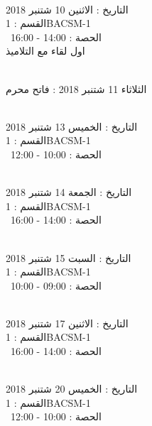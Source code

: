 \par
\noindent\makebox[\linewidth]{\rule{\paperwidth}{0.4pt}}
 \\
التاريخ : الاثنين 10 شتنبر 2018 \\
القسم : 1BACSM-1 \\
 \  
الحصة : 14:00 - 16:00 \\
\indent \indent
اول لقاء مع التلاميذ
\par
\noindent\makebox[\linewidth]{\rule{\paperwidth}{0.4pt}}
 \\
الثلاثاء 11 شتنبر 2018 :   فاتح محرم
\par
\noindent\makebox[\linewidth]{\rule{\paperwidth}{0.4pt}}
 \\
التاريخ : الخميس 13 شتنبر 2018 \\
القسم : 1BACSM-1 \\
 \  
الحصة : 10:00 - 12:00 \\
\par
\noindent\makebox[\linewidth]{\rule{\paperwidth}{0.4pt}}
 \\
التاريخ : الجمعة 14 شتنبر 2018 \\
القسم : 1BACSM-1 \\
 \  
الحصة : 14:00 - 16:00 \\
\par
\noindent\makebox[\linewidth]{\rule{\paperwidth}{0.4pt}}
 \\
التاريخ : السبت 15 شتنبر 2018 \\
القسم : 1BACSM-1 \\
 \  
الحصة : 09:00 - 10:00 \\
\par
\noindent\makebox[\linewidth]{\rule{\paperwidth}{0.4pt}}
 \\
التاريخ : الاثنين 17 شتنبر 2018 \\
القسم : 1BACSM-1 \\
 \  
الحصة : 14:00 - 16:00 \\
\par
\noindent\makebox[\linewidth]{\rule{\paperwidth}{0.4pt}}
 \\
التاريخ : الخميس 20 شتنبر 2018 \\
القسم : 1BACSM-1 \\
 \  
الحصة : 10:00 - 12:00 \\
\par
